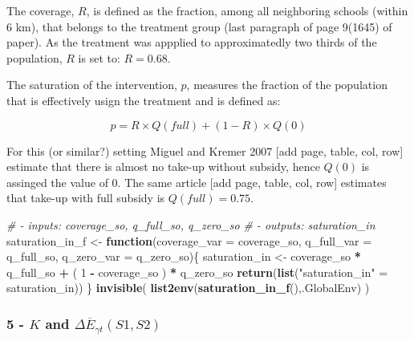\documentclass[]{article}
\newenvironment{Shaded}{\begin{snugshade}}{\end{snugshade}}
\newcommand{\CommentTok}[1]{\textcolor[rgb]{0.56,0.35,0.01}{\textit{#1}}}
\newcommand{\ControlFlowTok}[1]{\textcolor[rgb]{0.13,0.29,0.53}{\textbf{#1}}}
\newcommand{\DataTypeTok}[1]{\textcolor[rgb]{0.13,0.29,0.53}{#1}}
\newcommand{\DecValTok}[1]{\textcolor[rgb]{0.00,0.00,0.81}{#1}}
\newcommand{\KeywordTok}[1]{\textcolor[rgb]{0.13,0.29,0.53}{\textbf{#1}}}
\newcommand{\NormalTok}[1]{#1}
\newcommand{\OperatorTok}[1]{\textcolor[rgb]{0.81,0.36,0.00}{\textbf{#1}}}
\newcommand{\StringTok}[1]{\textcolor[rgb]{0.31,0.60,0.02}{#1}}
\begin{document}
The coverage, \(R\), is defined as the fraction, among all neighboring
schools (within 6 km), that belongs to the treatment group (last
paragraph of page 9(1645) of paper). As the treatment was appplied to
approximatedly two thirds of the population, \(R\) is set to:
\(R = 0.68\).

The saturation of the intervention, \(p\), measures the fraction of the
population that is effectively usign the treatment and is defined as:

\begin{equation}
p = R \times Q(full)  + (1 - R) \times Q(0)
\end{equation}

For this (or similar?) setting Miguel and Kremer 2007 {[}add page,
table, col, row{]} estimate that there is almost no take-up without
subsidy, hence \(Q(0)\) is assinged the value of 0. The same article
{[}add page, table, col, row{]} estimates that take-up with full subsidy
is \(Q(full) = 0.75\).

\begin{Shaded}
\begin{Highlighting}[]
\CommentTok{# - inputs: coverage_so, q_full_so, q_zero_so }
\CommentTok{# - outputs: saturation_in }
\NormalTok{saturation_in_f <-}\StringTok{ }\ControlFlowTok{function}\NormalTok{(}\DataTypeTok{coverage_var =}\NormalTok{ coverage_so, }\DataTypeTok{q_full_var =}\NormalTok{ q_full_so, }\DataTypeTok{q_zero_var =}\NormalTok{ q_zero_so)\{}
\NormalTok{    saturation_in <-}\StringTok{ }\NormalTok{coverage_so }\OperatorTok{*}\StringTok{ }\NormalTok{q_full_so }\OperatorTok{+}\StringTok{ }\NormalTok{( }\DecValTok{1} \OperatorTok{-}\StringTok{ }\NormalTok{coverage_so ) }\OperatorTok{*}\StringTok{ }\NormalTok{q_zero_so}
    \KeywordTok{return}\NormalTok{(}\KeywordTok{list}\NormalTok{(}\StringTok{"saturation_in"}\NormalTok{ =}\StringTok{ }\NormalTok{saturation_in)) }
\NormalTok{\} }
\KeywordTok{invisible}\NormalTok{( }\KeywordTok{list2env}\NormalTok{(}\KeywordTok{saturation_in_f}\NormalTok{(),.GlobalEnv) )}
\end{Highlighting}
\end{Shaded}

\hypertarget{k-and-delta-overlinee_gamma-ts1s2}{%
\subsubsection{\texorpdfstring{5 - \(K\) and
\(\Delta \overline{E}_{\gamma t}(S1,S2)\)}{5 - K and \textbackslash{}Delta \textbackslash{}overline\{E\}\_\{\textbackslash{}gamma t\}(S1,S2)}}\label{k-and-delta-overlinee_gamma-ts1s2}}
\end{document}
